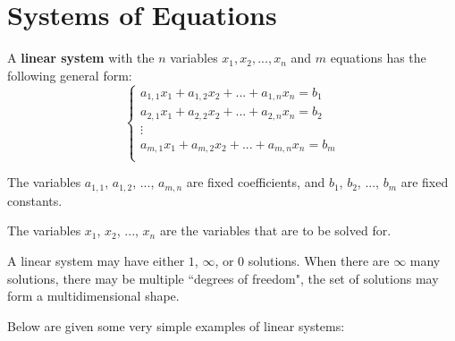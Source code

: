 \documentclass{article}
\begin{document}
\section*{Systems of Equations}

A {\bf linear system} with the \(n\) variables \(x_1, x_2, ..., x_n\) and \(m\) equations has the following general form:
\[\left\{\begin{array}{c}
a_{1,1} x_1 + a_{1,2} x_2 + ... + a_{1,n} x_n = b_1 \\
a_{2,1} x_1 + a_{2,2} x_2 + ... + a_{2,n} x_n = b_2 \\
\vdots \\
a_{m,1} x_1 + a_{m,2} x_2 + ... + a_{m,n} x_n = b_m \\
\end{array}\right.\] 

The variables \(a_{1,1}\), \(a_{1,2}\), ..., \(a_{m,n}\) are fixed coefficients, and \(b_1\), \(b_2\), ..., \(b_m\) are fixed constants. 

The variables \(x_1\), \(x_2\), ..., \(x_n\) are the variables that are to be solved for. 

A linear system may have either \(1\), \(\infty\), or \(0\) solutions. When there are \(\infty\) many solutions, there may be multiple ``degrees of freedom", the set of solutions may form a multidimensional shape.

Below are given some very simple examples of linear systems:
\end{document}
